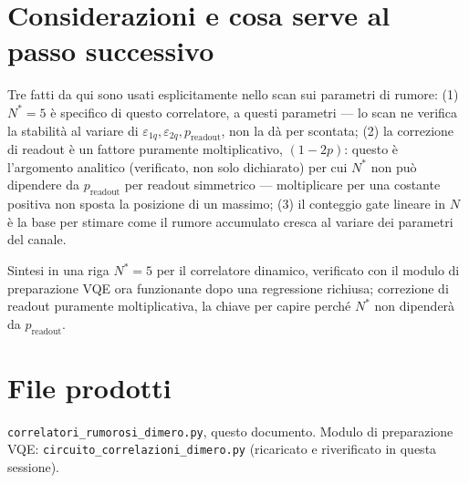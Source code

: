 \documentclass[11pt,a4paper]{article}
\begin{document}
\section{Considerazioni e cosa serve al passo successivo}

Tre fatti da qui sono usati esplicitamente nello scan sui parametri di
rumore: (1) $N^*=5$ è specifico di questo correlatore, a questi
parametri --- lo scan ne verifica la stabilità al variare di
$\varepsilon_{1q},\varepsilon_{2q},p_\text{readout}$, non la dà per
scontata; (2) la correzione di readout è un fattore puramente
moltiplicativo, $(1-2p)$: questo è l'argomento analitico (verificato,
non solo dichiarato) per cui $N^*$ non può dipendere da $p_\text{readout}$
per readout simmetrico --- moltiplicare per una costante positiva non
sposta la posizione di un massimo; (3) il conteggio gate lineare in $N$
è la base per stimare come il rumore accumulato cresca al variare dei
parametri del canale.

\begin{okbox}{Sintesi in una riga}
$N^*=5$ per il correlatore dinamico, verificato con il modulo di
preparazione VQE ora funzionante dopo una regressione richiusa;
correzione di readout puramente moltiplicativa, la chiave per capire
perché $N^*$ non dipenderà da $p_\text{readout}$.
\end{okbox}

\section*{File prodotti}

\texttt{correlatori\_rumorosi\_dimero.py}, questo documento. Modulo di
preparazione VQE: \texttt{circuito\_correlazioni\_dimero.py} (ricaricato
e riverificato in questa sessione).
\end{document}
